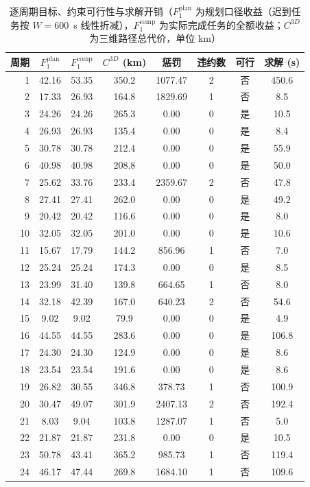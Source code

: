 \documentclass[a4paper,11pt]{article}
\begin{document}
\begin{table}[htbp]\centering
\caption{逐周期目标、约束可行性与求解开销（$F_1^{\mathrm{plan}}$ 为规划口径收益（迟到任务按 $W=600$~s 线性折减），$F_1^{\mathrm{comp}}$ 为实际完成任务的全额收益；$C^{3D}$ 为三维路径总代价，单位 km）}
\label{tab:exp01-objective}
\begin{tabular}{rccccccc}
\toprule
周期 & $F_1^{\mathrm{plan}}$ & $F_1^{\mathrm{comp}}$ & $C^{3D}$ (km) & 惩罚 & 违约数 & 可行 & 求解 (s) \\
\midrule
1 & 42.16 & 53.35 & 350.2 & 1077.47 & 2 & 否 & 450.6 \\
2 & 17.33 & 26.93 & 164.8 & 1829.69 & 1 & 否 & 8.5 \\
3 & 24.26 & 24.26 & 265.3 & 0.00 & 0 & 是 & 10.5 \\
4 & 26.93 & 26.93 & 135.4 & 0.00 & 0 & 是 & 8.4 \\
5 & 30.78 & 30.78 & 212.4 & 0.00 & 0 & 是 & 55.9 \\
6 & 40.98 & 40.98 & 208.8 & 0.00 & 0 & 是 & 50.0 \\
7 & 25.62 & 33.76 & 233.4 & 2359.67 & 2 & 否 & 47.8 \\
8 & 27.41 & 27.41 & 262.0 & 0.00 & 0 & 是 & 49.2 \\
9 & 20.42 & 20.42 & 116.6 & 0.00 & 0 & 是 & 8.0 \\
10 & 32.05 & 32.05 & 201.0 & 0.00 & 0 & 是 & 10.6 \\
11 & 15.67 & 17.79 & 144.2 & 856.96 & 1 & 否 & 7.0 \\
12 & 25.24 & 25.24 & 174.3 & 0.00 & 0 & 是 & 8.5 \\
13 & 23.99 & 31.40 & 139.8 & 664.65 & 1 & 否 & 8.0 \\
14 & 32.18 & 42.39 & 167.0 & 640.23 & 2 & 否 & 54.6 \\
15 & 9.02 & 9.02 & 79.9 & 0.00 & 0 & 是 & 4.9 \\
16 & 44.55 & 44.55 & 283.6 & 0.00 & 0 & 是 & 106.8 \\
17 & 24.30 & 24.30 & 124.9 & 0.00 & 0 & 是 & 8.6 \\
18 & 23.54 & 23.54 & 191.6 & 0.00 & 0 & 是 & 8.6 \\
19 & 26.82 & 30.55 & 346.8 & 378.73 & 1 & 否 & 100.9 \\
20 & 30.47 & 49.07 & 301.9 & 2407.13 & 2 & 否 & 192.4 \\
21 & 8.03 & 9.04 & 103.8 & 1287.07 & 1 & 否 & 5.0 \\
22 & 21.87 & 21.87 & 231.8 & 0.00 & 0 & 是 & 10.5 \\
23 & 50.78 & 43.41 & 365.2 & 985.73 & 1 & 否 & 119.4 \\
24 & 46.17 & 47.44 & 269.8 & 1684.10 & 1 & 否 & 109.6 \\
\bottomrule
\end{tabular}
\end{table}
\end{document}
